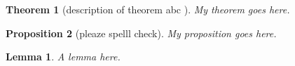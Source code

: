 \documentclass{article}
\newtheorem{thm}{Theorem}[section]
\newtheorem{prp}[thm]{Proposition}
\newtheorem{lemma}{Lemma}
\begin{document}
\begin{thm}[description of theorem abc \cite{abc}]
  My theorem goes here.
\end{thm}

\begin{prp}[pleaze spelll check]
  My proposition goes here.
\end{prp}

\begin{lemma}
  A lemma here.
\end{lemma}
\end{document}

